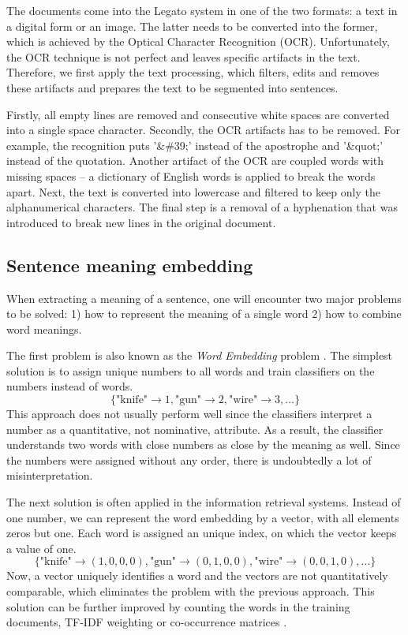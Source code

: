 \documentclass[
  digital, %
  notable,   %
  nolof,     %
  nolot,     %
]{fithesis3}
\begin{document}
The documents come into the Legato system in one of the two formats: a text in a digital form or an image.
The latter needs to be converted into the former, which is achieved by the Optical Character Recognition (OCR).
Unfortunately, the OCR technique is not perfect and leaves specific artifacts in the text.
Therefore, we first apply the text processing, which filters, edits and removes these artifacts and prepares the text to be segmented into sentences.

Firstly, all empty lines are removed and consecutive white spaces are converted into a single space character.
Secondly, the OCR artifacts has to be removed.
For example, the recognition puts '\&\#39;' instead of the apostrophe and '\&quot;' instead of the quotation.
Another artifact of the OCR are coupled words with missing spaces -- a dictionary of English words is applied to break the words apart.
Next, the text is converted into lowercase and filtered to keep only the alphanumerical characters.
The final step is a removal of a hyphenation that was introduced to break new lines in the original document.

\subsection{Sentence meaning embedding}
\label{sec:sentence-meaning}
When extracting a meaning of a sentence, one will encounter two major problems to be solved: 1) how to represent the meaning of a single word 2) how to combine word meanings.

The first problem is also known as the \textit{Word Embedding} problem \cite{wordEmbeddings}.
The simplest solution is to assign unique numbers to all words and train classifiers on the numbers instead of words.
$$
\{\text{"knife"} \rightarrow 1, \text{"gun"} \rightarrow 2, \text{"wire"} \rightarrow 3, \dots\}
$$
This approach does not usually perform well since the classifiers interpret a number as a quantitative, not nominative,  attribute.
As a result, the classifier understands two words with close numbers as close by the meaning as well.
Since the numbers were assigned without any order, there is undoubtedly a lot of misinterpretation.

The next solution is often applied in the information retrieval systems.
Instead of one number, we can represent the word embedding by a vector, with all elements zeros but one.
Each word is assigned an unique index, on which the vector keeps a value of one.
$$
\{\text{"knife"} \rightarrow (1,0,0,0), \text{"gun"} \rightarrow (0,1,0,0), \text{"wire"} \rightarrow (0,0,1,0), \dots\}
$$
Now, a vector uniquely identifies a word and the vectors are not quantitatively comparable, which eliminates the problem with the previous approach.
This solution can be further improved by counting the words in the training documents, TF-IDF weighting or co-occurrence matrices \cite{wordEmbeddings}.
\end{document}
